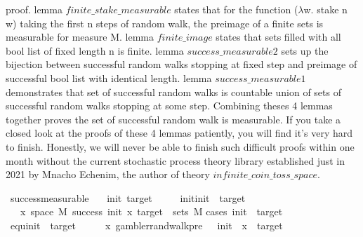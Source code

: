 \begin{isabellebody}
\begin{isamarkuptext}
proof. lemma $finite\_stake\_measurable$ states that for the function ($\lambda$w. stake n w) taking the first n 
steps of random walk, the preimage of a finite sets is measurable for measure M. lemma $finite\_image$ 
states that sets filled with all bool list of fixed length n is finite. lemma $success\_measurable2$ sets
up the bijection between successful random walks stopping at fixed step and preimage of successful bool
list with identical length. lemma $success\_measurable1$ demonstrates that set of successful random
walks is countable union of sets of successful random walks stopping at some step. Combining theses 4 
lemmas together proves the set of successful random walk is measurable. If you take a closed look at 
the proofs of these 4 lemmas patiently, you will find it's very hard to finish. Honestly, we will 
never be able to finish such difficult proofs within one month without the current stochastic process
theory library established just in 2021 by Mnacho Echenim, the author of theory $infinite\_coin\_toss\_space$.%
\end{isamarkuptext}\isamarkuptrue%
\isamarkupfalse%
\ success{\isacharunderscore}{\kern0pt}measurable{\isacharcolon}{\kern0pt}\isanewline
\ \ \ init\ target\isanewline
\ \ \ {\isachardoublequoteopen}{}\ {\isasymle}\ init{\isachardoublequoteclose}{\isachardoublequoteopen}init\ {\isasymle}\ target{\isachardoublequoteclose}\isanewline
\ \ \ {\isachardoublequoteopen}{\isacharbraceleft}{\kern0pt}x{\isasymin}\ space\ M{\isachardot}{\kern0pt}\ success\ init\ x\ target{\isacharbraceright}{\kern0pt}\ {\isasymin}\ sets\ M{\isachardoublequoteclose}\isanewline
%
\isadelimproof
%
\endisadelimproof
%
\isatagproof
{}\isamarkupfalse%
{\isacharparenleft}{\kern0pt}cases\ {\isachardoublequoteopen}init\ {\isacharequal}{\kern0pt}\ target{\isachardoublequoteclose}{\isacharparenright}{\kern0pt}\isanewline
\ \ \isamarkupfalse%
\ equ{\isacharcolon}{\kern0pt}{\isachardoublequoteopen}init\ {\isacharequal}{\kern0pt}\ target{\isachardoublequoteclose}\isanewline
\ \ \isamarkupfalse%
\ \isamarkupfalse%
\ {\isachardoublequoteopen}{\isasymAnd}x{\isachardot}{\kern0pt}\ gambler{\isacharunderscore}{\kern0pt}rand{\isacharunderscore}{\kern0pt}walk{\isacharunderscore}{\kern0pt}pre\ {}\ {\isacharparenleft}{\kern0pt}{\isacharminus}{\kern0pt}{}{\isacharparenright}{\kern0pt}\ init\ {}\ x\ {\isacharequal}{\kern0pt}\ target{\isachardoublequoteclose}\isanewline

\end{isabellebody}
